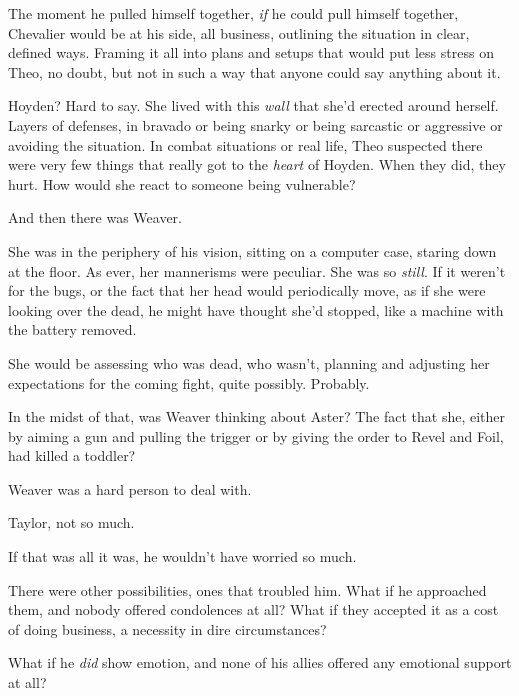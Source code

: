 The moment he pulled himself together, \emph{if} he could pull himself together, Chevalier would be at his side, all business, outlining the situation in clear, defined ways.  Framing it all into plans and setups that would put less stress on Theo, no doubt, but not in such a way that anyone could say anything about it.



Hoyden?  Hard to say.  She lived with this \emph{wall} that she'd erected around herself.  Layers of defenses, in bravado or being snarky or being sarcastic or aggressive or avoiding the situation.  In combat situations or real life, Theo suspected there were very few things that really got to the \emph{heart} of Hoyden.  When they did, they hurt.  How would she react to someone being vulnerable?



And then there was Weaver.



She was in the periphery of his vision, sitting on a computer case, staring down at the floor.  As ever, her mannerisms were peculiar.  She was so \emph{still}.  If it weren't for the bugs, or the fact that her head would periodically move, as if she were looking over the dead, he might have thought she'd stopped, like a machine with the battery removed.



She would be assessing who was dead, who wasn't, planning and adjusting her expectations for the coming fight, quite possibly.  Probably.



In the midst of that, was Weaver thinking about Aster?  The fact that she, either by aiming a gun and pulling the trigger or by giving the order to Revel and Foil, had killed a toddler?



Weaver was a hard person to deal with.



Taylor, not so much.



If that was all it was, he wouldn't have worried so much.



There were other possibilities, ones that troubled him.  What if he approached them, and nobody offered condolences at all?  What if they accepted it as a cost of doing business, a necessity in dire circumstances?



What if he \emph{did} show emotion, and none of his allies offered any emotional support at all?



